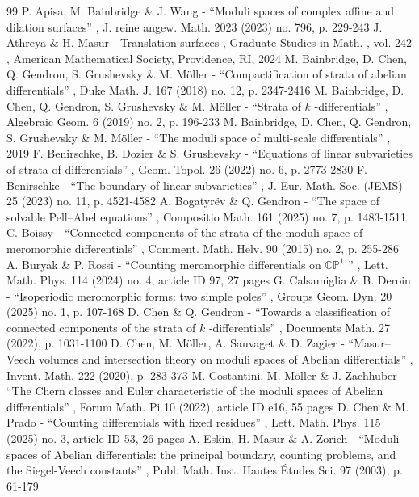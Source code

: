 \documentclass[11pt]{article}
\theoremstyle{definition}
\begin{document}
\begin{thebibliography}{99}
 P. Apisa, M. Bainbridge \& J. Wang - “Moduli spaces of complex affine and dilation surfaces” , J. reine angew. Math. 2023 (2023) no. 796, p. 229-243
 J. Athreya \& H. Masur - Translation surfaces , Graduate Studies in Math. , vol. 242 , American Mathematical Society, Providence, RI, 2024
 M. Bainbridge, D. Chen, Q. Gendron, S. Grushevsky \& M. Möller - “Compactification of strata of abelian differentials” , Duke Math. J. 167 (2018) no. 12, p. 2347-2416
 M. Bainbridge, D. Chen, Q. Gendron, S. Grushevsky \& M. Möller - “Strata of $k$ -differentials” , Algebraic Geom. 6 (2019) no. 2, p. 196-233
 M. Bainbridge, D. Chen, Q. Gendron, S. Grushevsky \& M. Möller - “The moduli space of multi-scale differentials” , 2019
 F. Benirschke, B. Dozier \& S. Grushevsky - “Equations of linear subvarieties of strata of differentials” , Geom. Topol. 26 (2022) no. 6, p. 2773-2830
 F. Benirschke - “The boundary of linear subvarieties” , J. Eur. Math. Soc. (JEMS) 25 (2023) no. 11, p. 4521-4582
 A. Bogatyrëv \& Q. Gendron - “The space of solvable Pell–Abel equations” , Compositio Math. 161 (2025) no. 7, p. 1483-1511
 C. Boissy - “Connected components of the strata of the moduli space of meromorphic differentials” , Comment. Math. Helv. 90 (2015) no. 2, p. 255-286
 A. Buryak \& P. Rossi - “Counting meromorphic differentials on $\mathbb{CP}^1$ ” , Lett. Math. Phys. 114 (2024) no. 4, article ID 97, 27 pages
 G. Calsamiglia \& B. Deroin - “Isoperiodic meromorphic forms: two simple poles” , Groups Geom. Dyn. 20 (2025) no. 1, p. 107-168
 D. Chen \& Q. Gendron - “Towards a classification of connected components of the strata of $k$ -differentials” , Documents Math. 27 (2022), p. 1031-1100
 D. Chen, M. Möller, A. Sauvaget \& D. Zagier - “Masur–Veech volumes and intersection theory on moduli spaces of Abelian differentials” , Invent. Math. 222 (2020), p. 283-373
 M. Costantini, M. Möller \& J. Zachhuber - “The Chern classes and Euler characteristic of the moduli spaces of Abelian differentials” , Forum Math. Pi 10 (2022), article ID e16, 55 pages
 D. Chen \& M. Prado - “Counting differentials with fixed residues” , Lett. Math. Phys. 115 (2025) no. 3, article ID 53, 26 pages
 A. Eskin, H. Masur \& A. Zorich - “Moduli spaces of Abelian differentials: the principal boundary, counting problems, and the Siegel-Veech constants” , Publ. Math. Inst. Hautes Études Sci. 97 (2003), p. 61-179

\end{thebibliography}
\end{document}
